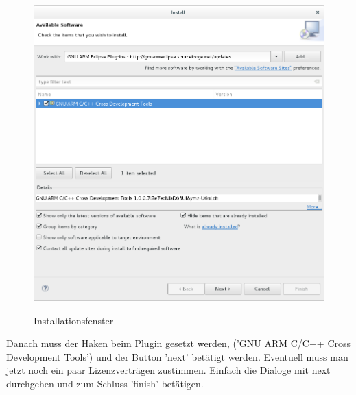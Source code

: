 \begin{figure}[h]
\begin{center}
\includegraphics[width=12cm]{grafiken/debugger/GNUauswahl.png}
\label{eclipse_gnu_auswahl}
\caption{Installationsfenster}
\end{center}
\end{figure}
Danach muss der Haken beim Plugin gesetzt werden, ('GNU ARM C/C++ Cross Development Tools') und der Button 'next' betätigt werden. Eventuell muss man jetzt noch ein paar Lizenzverträgen zustimmen. Einfach die Dialoge mit next durchgehen und zum Schluss 'finish' betätigen.
